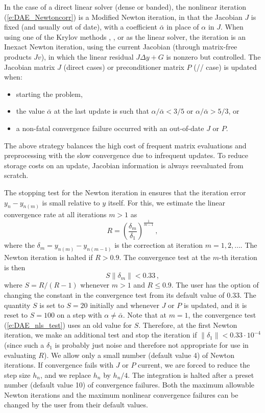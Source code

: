In the case of a direct linear solver (dense or banded), the nonlinear 
iteration (\ref{e:DAE_Newtoncorr}) is a Modified Newton iteration, in
that the Jacobian $J$ is fixed (and usually out of date), with a coefficient 
$\bar\alpha$ in place of $\alpha$ in $J$. When using one of the Krylov methods
{\spgmr}, {\spbcg}, or {\sptfqmr} as the linear solver, the iteration is an
Inexact Newton iteration, using the current Jacobian (through matrix-free products
$Jv$), in which the linear residual $J\Delta y + G$ is nonzero but controlled.
The Jacobian matrix $J$ (direct cases) or preconditioner matrix $P$ 
({\spgmr}/{\spbcg}/{\sptfqmr} case) is updated when:
\begin{itemize}
\item starting the problem,
\item the value $\bar\alpha$ at the last update is such that
  $\alpha / {\bar\alpha} < 3/5$ or $\alpha / {\bar\alpha} > 5/3$, or
\item a non-fatal convergence failure occurred with an out-of-date $J$ or $P$.
\end{itemize}
The above strategy balances the high cost of frequent matrix evaluations
and preprocessing with the slow convergence due to infrequent updates.
To reduce storage costs on an update, Jacobian information is always
reevaluated from scratch.

The stopping test for the Newton iteration
in {\idas} ensures that the iteration error $y_n - y_{n(m)}$ is small relative
to $y$ itself. For this, we estimate the linear convergence rate at all 
iterations $m>1$ as
\begin{equation*}
R = \left( \frac{\delta_m}{\delta_1} \right)^{\frac{1}{m-1}} \, , 
\end{equation*}
where the $\delta_m = y_{n(m)} - y_{n(m-1)}$ is the correction at
iteration $m=1,2,\ldots$. The Newton iteration is halted if $R>0.9$.
The convergence test at the $m$-th iteration is then
\begin{equation}\label{e:DAE_nls_test}
S \| \delta_m \| < 0.33 \, ,
\end{equation}
where $S = R/(R-1)$ whenever $m>1$ and $R\le 0.9$. The user has the
option of changing the constant in the convergence test from its default 
value of $0.33$.
%
The quantity $S$ is set to $S=20$ initially and whenever $J$ or $P$ is
updated, and it is reset to $S=100$ on a step with $\alpha \neq \bar\alpha$.
Note that at $m=1$, the convergence test (\ref{e:DAE_nls_test}) uses an old 
value for $S$. Therefore, at the first Newton iteration, we make an additional
test and stop the iteration if $\|\delta_1\| < 0.33 \cdot 10^{-4}$
(since such a $\delta_1$ is probably just noise and therefore not appropriate 
for use in evaluating $R$).
%
We allow only a small number (default value 4) of Newton iterations.
If convergence fails with $J$ or $P$ current, 
we are forced to reduce the step size $h_n$, and we replace $h_n$ by $h_n/4$.
The integration is halted after a preset number (default value 10)
of convergence failures. Both the maximum allowable Newton iterations
and the maximum nonlinear convergence failures can be changed by the user
from their default values.

